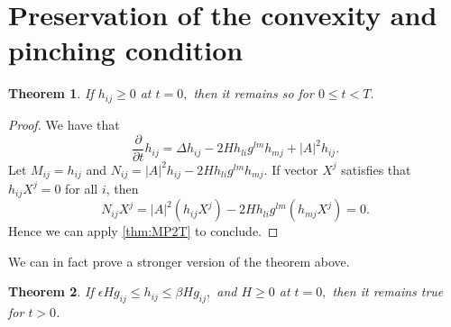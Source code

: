 \documentclass[a4paper]{report}
\newtheorem{theorem}{Theorem}
\theoremstyle{remark}
\begin{document}
\section{Preservation of the convexity and pinching condition}
\begin{theorem}
	If $h_{ij}^{} \geq 0 $ at $t=0,$ then it remains so for $0 \leq t < T.$ 
\end{theorem}
\begin{proof}
	We have that \[\frac{\partial }{\partial t} h_{ij}^{} = \Delta h_{ij}^{} - 2 H h_{li }^{} g_{}^{lm } h_{mj}^{} + \left| A \right| ^2 h_{ij}^{}.\]
	Let $M_{ij }^{} = h_{ij }^{} $ and $N_{ij }^{} = \left| A \right| ^2 h_{ij }^{} - 2 H h_{li }^{} g_{}^{lm } h_{mj}^{}.$
	If vector $X^j$ satisfies that $h_{ij }^{} X^j=0$ for all $i$, then
	\[N_{ij }^{} X^j = \left| A \right| ^2 (h_{ij }^{} X^j) - 2 H h_{li }^{} g_{}^{lm } (h_{mj}^{}X^j)=0.\]
	Hence we can apply \autoref{thm:MP2T} to conclude.
\end{proof}
We can in fact prove a stronger version of the theorem above.
\begin{theorem}
	If $\epsilon H g_{ij }^{} \leq h_{ij }^{} \leq \beta H g_{ij }^{} ,$ and $H \geq 0$ at $t=0,$ then it remains true for $t>0$.
\end{theorem}
\end{document}
